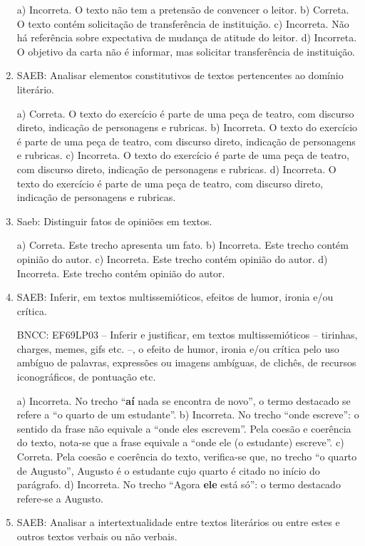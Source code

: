 \begin{enumerate}
a) Incorreta. O texto não tem a pretensão de convencer o leitor.
b) Correta. O texto contém solicitação de transferência de instituição.
c) Incorreta. Não há referência sobre expectativa de mudança de atitude do leitor. 
d) Incorreta. O objetivo da carta não é informar, mas solicitar transferência de instituição.

\item
SAEB: Analisar elementos constitutivos de textos pertencentes ao domínio literário.

a) Correta. O texto do exercício é parte de uma peça de teatro, com discurso direto, indicação
de personagens e rubricas.
b) Incorreta. O texto do exercício é parte de uma peça de teatro, com discurso direto, indicação
de personagens e rubricas.
c) Incorreta. O texto do exercício é parte de uma peça de teatro, com discurso direto, indicação
de personagens e rubricas.
d) Incorreta. O texto do exercício é parte de uma peça de teatro, com discurso direto, indicação
de personagens e rubricas.

\item
Saeb: Distinguir fatos de opiniões em textos.
 
a) Correta. Este trecho apresenta um fato.
b) Incorreta. Este trecho contém opinião do autor.
c) Incorreta. Este trecho contém opinião do autor.
d) Incorreta. Este trecho contém opinião do autor.

\item
SAEB: Inferir, em textos multissemióticos, efeitos de humor, ironia e/ou
crítica.

BNCC: EF69LP03 -- Inferir e justificar, em textos multissemióticos --
tirinhas, charges, memes, gifs etc. --, o efeito de humor, ironia e/ou
crítica pelo uso ambíguo de palavras, expressões ou imagens ambíguas, de
clichês, de recursos iconográficos, de pontuação etc.

a) Incorreta. No trecho ``\textbf{aí} nada se encontra de novo'', o termo destacado se refere a 
``o quarto de um estudante''.
b) Incorreta. No trecho ``onde escreve'': o sentido da frase não equivale a ``onde eles escrevem''.
Pela coesão e coerência do texto, nota-se que a frase equivale a ``onde ele (o estudante) escreve''.
c) Correta. Pela coesão e coerência do texto, verifica-se que, no trecho ``o quarto de Augusto'', 
Augusto é o estudante cujo quarto é citado no início do parágrafo.  
d) Incorreta. No trecho ``Agora \textbf{ele} está só'': o termo destacado refere-se a Augusto.

\item
SAEB: Analisar a intertextualidade entre textos literários ou entre
estes e outros textos verbais ou não verbais.


\end{enumerate}
